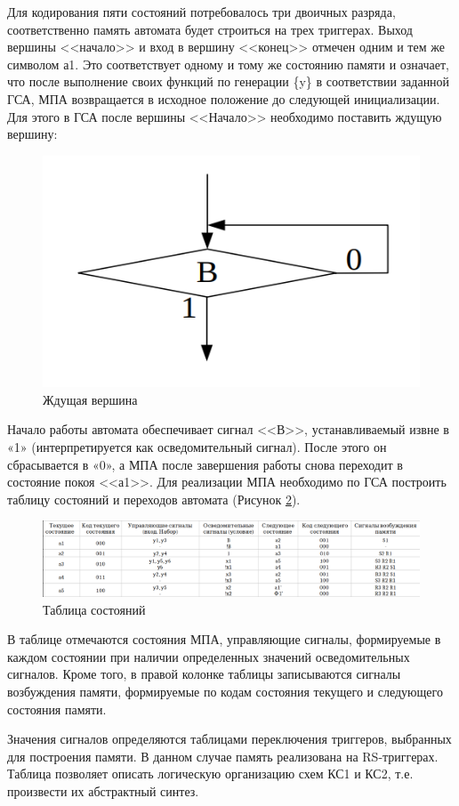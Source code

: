 \documentclass[a4paper,14pt]{extarticle}
\begin{document}
Для кодирования пяти состояний потребовалось три двоичных разряда, 
соответственно память автомата будет строиться на трех триггерах.
Выход вершины <<начало>> и вход в вершину <<конец>> отмечен одним и
тем же символом а1. Это соответствует одному и тому же состоянию памяти и
означает, что после выполнение своих функций по генерации \{y\} в соответствии заданной ГСА, МПА возвращается в исходное положение до следующей
инициализации. Для этого в ГСА после вершины <<Начало>> необходимо поставить ждущую вершину:

\begin{figure}[htbp]
	\centering
	\includegraphics[width=0.3\linewidth]{images/delay-node}
	\caption{Ждущая вершина}
	\label{fig:delay-node}
\end{figure}

Начало работы автомата обеспечивает сигнал <<В>>, устанавливаемый
извне в «1» (интерпретируется как осведомительный сигнал). После этого
он сбрасывается в «0», а МПА после завершения работы снова переходит
в состояние покоя <<а1>>.
Для реализации МПА необходимо по ГСА построить таблицу состояний
и переходов автомата (Рисунок \ref{fig:state-table}). 
\begin{figure}
	\centering
	\includegraphics[width=\linewidth]{images/state-table}
	\caption{Таблица состояний}
	\label{fig:state-table}
\end{figure}

В таблице отмечаются состояния МПА, управляющие сигналы, формируемые в каждом состоянии при наличии определенных значений осведомительных сигналов. Кроме того, в правой колонке таблицы записываются сигналы возбуждения памяти, формируемые по кодам состояния текущего и следующего состояния памяти.

 Значения сигналов определяются таблицами переключения триггеров, выбранных для построения памяти. В данном случае память реализована на RS-триггерах.
Таблица позволяет описать логическую организацию схем КС1 и КС2,
т.е. произвести их абстрактный синтез.
\end{document}
